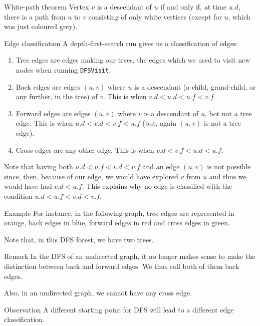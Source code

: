 \documentclass[a4paper]{article}
\begin{document}
\begin{parag}{White-path theorem}
    Vertex $v$ is a descendant of $u$ if and only if, at time $u.d$, there is a path from $u$ to $v$ consisting of only white vertices (except for $u$, which was just coloured grey).
\end{parag}

\begin{parag}{Edge classification}
    A depth-first-search run gives us a classification of edges:
    \begin{enumerate}
        \item Tree edges are edges making our trees, the edges which we used to visit new nodes when running \texttt{DFSVisit}.
        \item Back edges are edges $\left(u, v\right)$ where $u$ is a descendant (a child, grand-child, or any further, in the tree) of $v$. This is when $v.d < u.d < u.f < v.f$.
        \item Forward edges are edges $\left(u, v\right)$ where $v$ is a descendant of $u$, bot not a tree edge. This is when $u.d < v.d < v.f < u.f$ (but, again $\left(u, v\right)$ is not a tree edge).
        \item Cross edges are any other edge. This is when $v.d < v.f < u.d < u.f$.
    \end{enumerate}

    Note that having both $u.d < u.f < v.d < v.f$ and an edge $\left(u, v\right)$ is not possible since, then, because of our edge, we would have explored $v$ from $u$ and thus we would have had $v.d < u.f$. This explains why no edge is classified with the condition $u.d < u.f < v.d < v.f$.

    \begin{subparag}{Example}
        For instance, in the following graph, tree edges are represented in orange, back edges in blue, forward edges in red and cross edges in green.

        Note that, in this DFS forest, we have two trees.
    \end{subparag}
    
    \begin{subparag}{Remark}
        In the DFS of an undirected graph, it no longer makes sense to make the distinction between back and forward edges. We thus call both of them back edges.

        Also, in an undirected graph, we cannot have any cross edge.
    \end{subparag}

    \begin{subparag}{Observation}
        A different starting point for DFS will lead to a different edge classification.
    \end{subparag}
\end{parag}
\end{document}
